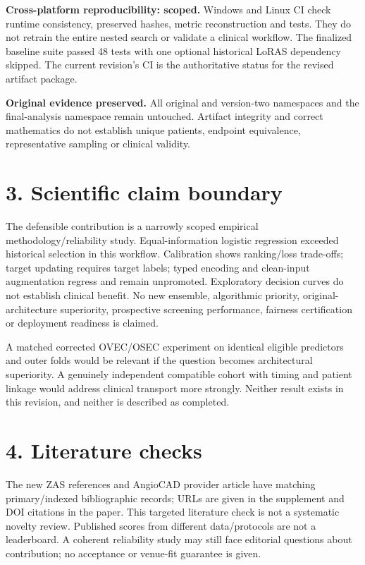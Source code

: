 \documentclass[10pt]{article}
\let\originalsection\section
\renewcommand\section{\Needspace{6\baselineskip}\originalsection}
\begin{document}
\textbf{Cross-platform reproducibility: scoped.} Windows and Linux CI check runtime consistency, preserved hashes, metric reconstruction and tests. They do not retrain the entire nested search or validate a clinical workflow. The finalized baseline suite passed 48 tests with one optional historical LoRAS dependency skipped. The current revision's CI is the authoritative status for the revised artifact package.

\textbf{Original evidence preserved.} All original and version-two namespaces and the final-analysis namespace remain untouched. Artifact integrity and correct mathematics do not establish unique patients, endpoint equivalence, representative sampling or clinical validity.

\section*{3. Scientific claim boundary}
The defensible contribution is a narrowly scoped empirical methodology/reliability study. Equal-information logistic regression exceeded historical selection in this workflow. Calibration shows ranking/loss trade-offs; target updating requires target labels; typed encoding and clean-input augmentation regress and remain unpromoted. Exploratory decision curves do not establish clinical benefit. No new ensemble, algorithmic priority, original-architecture superiority, prospective screening performance, fairness certification or deployment readiness is claimed.

A matched corrected OVEC/OSEC experiment on identical eligible predictors and outer folds would be relevant if the question becomes architectural superiority. A genuinely independent compatible cohort with timing and patient linkage would address clinical transport more strongly. Neither result exists in this revision, and neither is described as completed.

\section*{4. Literature checks}
The new ZAS references and AngioCAD provider article have matching primary/indexed bibliographic records; URLs are given in the supplement and DOI citations in the paper. This targeted literature check is not a systematic novelty review. Published scores from different data/protocols are not a leaderboard. A coherent reliability study may still face editorial questions about contribution; no acceptance or venue-fit guarantee is given.
\end{document}
